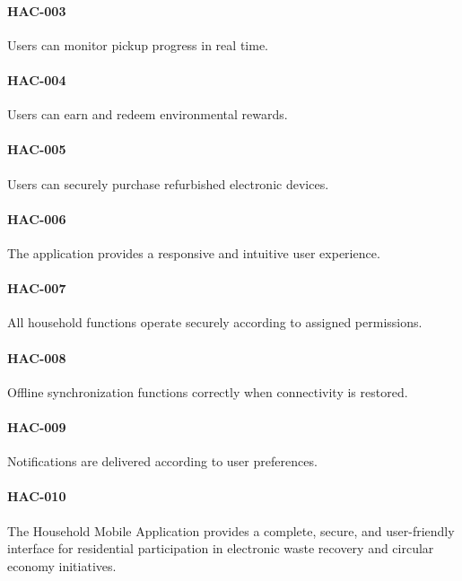 \paragraph{HAC-003}

Users can monitor pickup progress in real time.

\paragraph{HAC-004}

Users can earn and redeem environmental rewards.

\paragraph{HAC-005}

Users can securely purchase refurbished electronic devices.

\paragraph{HAC-006}

The application provides a responsive and intuitive user experience.

\paragraph{HAC-007}

All household functions operate securely according to assigned
permissions.

\paragraph{HAC-008}

Offline synchronization functions correctly when connectivity is
restored.

\paragraph{HAC-009}

Notifications are delivered according to user preferences.

\paragraph{HAC-010}

The Household Mobile Application provides a complete, secure, and
user-friendly interface for residential participation in electronic
waste recovery and circular economy initiatives.

